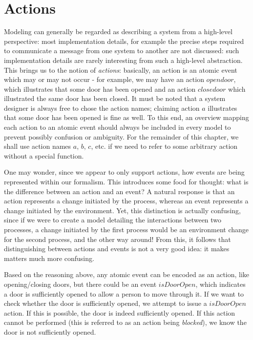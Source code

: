 \section{Actions}
\label{sec:actions}

Modeling can generally be regarded as describing a system from a high-level perspective: most implementation details, for example the precise steps required to communicate a message from one system to another are not discussed: such implementation details are rarely interesting from such a high-level abstraction. This brings us to the notion of \emph{actions}: basically, an action is an atomic event which may or may not occur - for example, we may have an action $opendoor$, which illustrates that some door has been opened and an action $closedoor$ which illustrated the same door has been closed. It must be noted that a system designer is always free to chose the action names; claiming action $a$ illustrates that some door has been opened is fine as well. To this end, an overview mapping each action to an atomic event should always be included in every model to prevent possibly confusion or ambiguity. For the remainder of this chapter, we shall use action names $a$, $b$, $c$, etc. if we need to refer to some arbitrary action without a special function.

One may wonder, since we appear to only support actions, how events are being represented within our formalism. This introduces some food for thought: what is the difference between an action and an event? A natural response is that an action represents a change initiated by the process, whereas an event represents a change initiated by the environment. Yet, this distinction is actually confusing, since if we were to create a model detailing the interactions between two processes, a change initiated by the first process would be an environment change for the second process, and the other way around! From this, it follows that distinguishing between actions and events is not a very good idea: it makes matters much more confusing.

Based on the reasoning above, any atomic event can be encoded as an action, like opening/closing doors, but there could be an event $isDoorOpen$, which indicates a door is sufficiently opened to allow a person to move through it. If we want to check whether the door is sufficiently opened, we attempt to issue a $isDoorOpen$ action. If this is possible, the door is indeed sufficiently opened. If this action cannot be performed (this is referred to as an action being \emph{blocked}), we know the door is not sufficiently opened.

